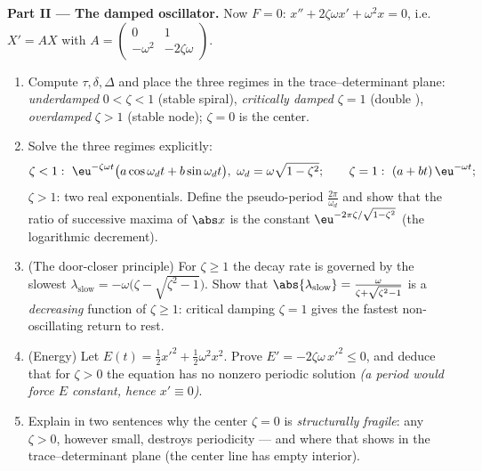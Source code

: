 \begin{problem}
\medskip
\noindent\textbf{Part II --- The damped oscillator.} Now $F =
0$: $x'' + 2\zeta\omega x' + \omega^2x = 0$, i.e.\ $X' = AX$
with $A = \begin{pmatrix} 0 & 1\\ -\omega^2 &
-2\zeta\omega\end{pmatrix}$.
\begin{enumerate}[resume]
  \item Compute $\tau, \delta, \Delta$ and place the three
        regimes in the trace--determinant plane:
        \emph{underdamped} $0 < \zeta < 1$ (stable spiral),
        \emph{critically damped} $\zeta = 1$ (double
        ), \emph{overdamped} $\zeta > 1$ (stable
        node); $\zeta = 0$ is the center.
  \item Solve the three regimes explicitly:
        \[
        \zeta < 1:\ \eu^{-\zeta\omega t}\bigl(a\cos\omega_d t
        + b\sin\omega_dt\bigr),\ \omega_d =
        \omega\sqrt{1-\zeta^2};
        \qquad
        \zeta = 1:\ (a + bt)\,\eu^{-\omega t};
        \]
        $\zeta > 1$: two real exponentials. Define the
        pseudo-period $\frac{2\pi}{\omega_d}$ and show that
        the ratio of successive maxima of $\abs x$ is the
        constant $\eu^{-2\pi\zeta/\sqrt{1-\zeta^2}}$ (the
        logarithmic decrement).
  \item (The door-closer principle) For $\zeta \geq 1$ the
        decay rate is governed by the slowest 
        $\lambda_{\mathrm{slow}} = -\omega\bigl(\zeta -
        \sqrt{\zeta^2-1}\bigr)$. Show that
        $\abs{\lambda_{\mathrm{slow}}} =
        \frac{\omega}{\zeta + \sqrt{\zeta^2 - 1}}$ is a
        \emph{decreasing} function of $\zeta \geq 1$:
        critical damping $\zeta = 1$ gives the fastest
        non-oscillating return to rest.
  \item (Energy) Let $E(t) = \frac12x'^2 +
        \frac12\omega^2x^2$. Prove $E' = -2\zeta\omega\,x'^2
        \leq 0$, and deduce that for $\zeta > 0$ the equation
        has no nonzero periodic solution \emph{(a period would
        force $E$ constant, hence $x' \equiv 0$)}.
  \item Explain in two sentences why the center $\zeta = 0$
        is \emph{structurally fragile}: any $\zeta > 0$,
        however small, destroys periodicity --- and where
        that shows in the trace--determinant plane (the
        center line has empty interior).
\end{enumerate}


\end{problem}
